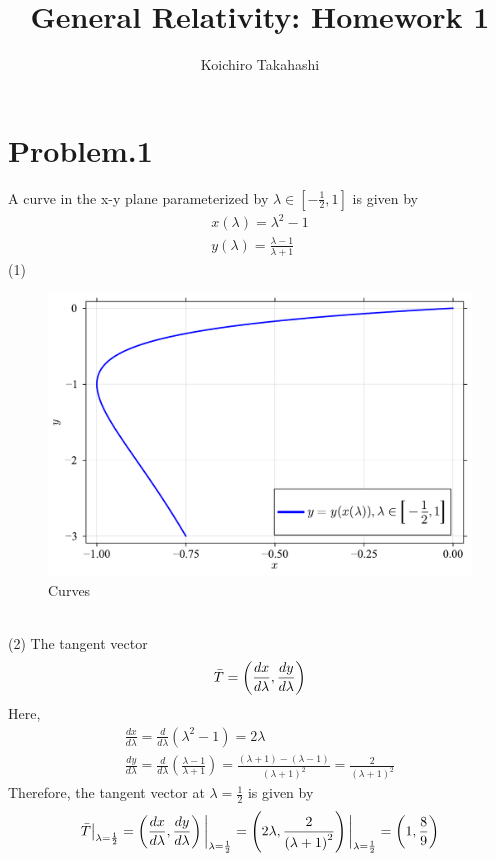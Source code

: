 \documentclass[12pt]{article}
\begin{document}
\title{General Relativity: Homework 1}
\author{Koichiro Takahashi}
\maketitle

\section*{Problem.1}
A curve in the x-y plane parameterized by $\lambda \in [-\frac{1}{2}, 1]$ is given by
\begin{gather*}
x(\lambda) = \lambda^2 - 1 \\
y(\lambda) = \frac{\lambda - 1}{\lambda + 1}
\end{gather*}
(1)
\begin{figure}[h]
  \begin{center}
  \includegraphics[width=0.7\linewidth]{Curves.pdf}
  \caption{Curves}
  \label{Curves}
  \end{center}
\end{figure}
\\
(2)
The tangent vector
\begin{gather*}
\Bar{T} = \left( \frac{d x}{d \lambda}, \frac{d y}{d \lambda}\right)
\end{gather*}
Here, 
\begin{gather*}
\frac{d x}{d \lambda} = \frac{d}{d \lambda} \left(\lambda^2 - 1 \right) = 2 \lambda \\[1em]
\frac{d y}{d \lambda} = \frac{d}{d \lambda} \left(\frac{\lambda - 1}{\lambda + 1} \right) = \frac{\left(\lambda + 1\right) - \left(\lambda - 1\right) }{\left(\lambda + 1\right)^2} = \frac{2}{\left(\lambda + 1\right)^2}
\end{gather*}
Therefore, the tangent vector at $\lambda = \frac{1}{2}$ is given by
\begin{gather*}
\Bar{T}\big|_{\lambda = \frac{1}{2}} = \left( \frac{d x}{d \lambda}, \frac{d y}{d \lambda}\right)\bigg|_{\lambda = \frac{1}{2}} = \left( 2 \lambda, \frac{2}{\left(\lambda + 1\right)^2}\right)\bigg|_{\lambda = \frac{1}{2}} = \left( 1, \frac{8}{9}\right)
\end{gather*}
\end{document}
